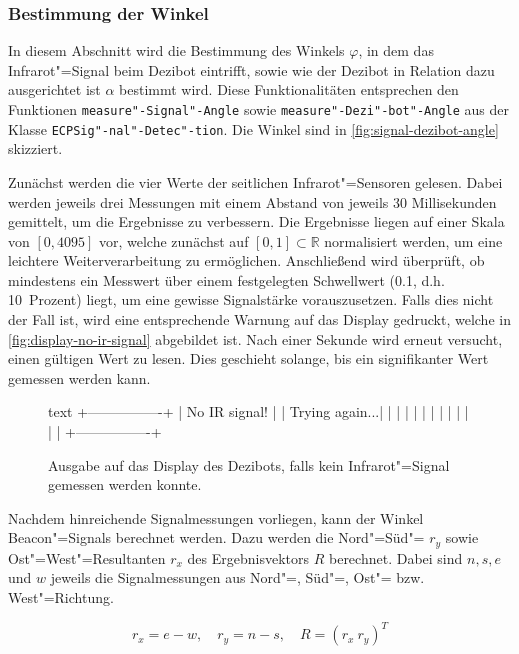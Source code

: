 \subsubsection{Bestimmung der Winkel}
\label{sec:angle-determination}

In diesem Abschnitt wird die Bestimmung des Winkels $\varphi$, in dem das Infrarot"=Signal beim Dezibot eintrifft, sowie wie der Dezibot in Relation dazu ausgerichtet ist $\alpha$ bestimmt wird. Diese Funktionalitäten entsprechen den Funktionen \texttt{measure"-Signal"-Angle} sowie \texttt{measure"-Dezi"-bot"-Angle} aus der Klasse \texttt{ECPSig"-nal"-Detec"-tion}. Die Winkel sind in \autoref{fig:signal-dezibot-angle} skizziert.
 
Zunächst werden die vier Werte der seitlichen Infrarot"=Sensoren gelesen. Dabei werden jeweils drei Messungen mit einem Abstand von jeweils 30 Millisekunden gemittelt, um die Ergebnisse zu verbessern. Die Ergebnisse liegen auf einer Skala von $[0,4095]$ vor, welche zunächst auf $[0,1] \subset \mathbb{R}$ normalisiert werden, um eine leichtere Weiterverarbeitung zu ermöglichen. Anschließend wird überprüft, ob mindestens ein Messwert über einem festgelegten Schwellwert (0.1, d.h. 10~Prozent) liegt, um eine gewisse Signalstärke vorauszusetzen. Falls dies nicht der Fall ist, wird eine entsprechende Warnung auf das Display gedruckt, welche in \autoref{fig:display-no-ir-signal} abgebildet ist. Nach einer Sekunde wird erneut versucht, einen gültigen Wert zu lesen. Dies geschieht solange, bis ein signifikanter Wert gemessen werden kann.

\begin{figure}[h]
\centering
\begin{cminted}{text}
+----------------+
| No IR signal!  |
| Trying again...|
|                |
|                |
|                |
|                |
|                |
|                |
+----------------+
\end{cminted}
\caption{Ausgabe auf das Display des Dezibots, falls kein Infrarot"=Signal gemessen werden konnte.}
\label{fig:display-no-ir-signal}
\end{figure}

Nachdem hinreichende Signalmessungen vorliegen, kann der Winkel Beacon"=Signals berechnet werden. Dazu werden die Nord"=Süd"= $r_{y}$ sowie Ost"=West"=Resultanten $r_{x}$ des Ergebnisvektors $R$ berechnet. Dabei sind $n,s,e$ und $w$ jeweils die Signalmessungen aus Nord"=, Süd"=, Ost"= bzw. West"=Richtung.

\begin{equation*}
    r_{x} = e - w, \quad r_{y} = n - s, \quad R = (r_x~r_y)^T
\end{equation*}

